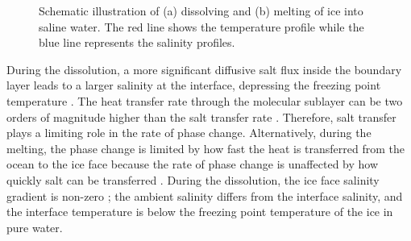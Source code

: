 \documentclass[11pt,a4paper]{article}
\begin{document}
	\begin{figure}[H]
		
		\centering
		\label{fig:4a}
		\label{fig:4b}
		
		\label{fig:4}
		
		\caption{Schematic illustration of (a) dissolving and (b) melting of ice into saline water. The red line shows the temperature profile while the blue line represents the salinity profiles.}
	\end{figure}


	During the dissolution, a more significant diffusive salt flux inside the boundary layer leads to a larger salinity at the interface, depressing the freezing point temperature \citep{gayen2016simulation}. The heat transfer rate through the molecular sublayer can be two orders of magnitude higher than the salt transfer rate \citep{mcphee1987dynamics,malyarenko2020synthesis}. Therefore, salt transfer plays a limiting role in the rate of phase change. Alternatively, during the melting, the phase change is limited by how fast the heat is transferred from the ocean to the ice face because the rate of phase change is unaffected by how quickly salt can be transferred \citep{malyarenko2020synthesis}. During the dissolution, the ice face salinity gradient is non-zero \citep{kerr2015dissolution}; the ambient salinity differs from the interface salinity, and the interface temperature is below the freezing point temperature of the ice in pure water.
	
\end{document}
